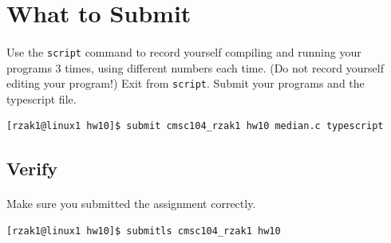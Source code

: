 \documentclass[letter,11pt]{article}
\begin{document}
\section*{What to Submit}
\paragraph{}Use the \texttt{script} command to record yourself compiling and running your programs 3 times, using different numbers each time. (Do not record yourself editing your program!) Exit from \texttt{script}. Submit your programs and the typescript file.

\begin{verbatim}
[rzak1@linux1 hw10]$ submit cmsc104_rzak1 hw10 median.c typescript
\end{verbatim}

\subsection*{Verify}
\paragraph{}Make sure you submitted the assignment correctly.
\begin{verbatim}
[rzak1@linux1 hw10]$ submitls cmsc104_rzak1 hw10
\end{verbatim}
\end{document}
